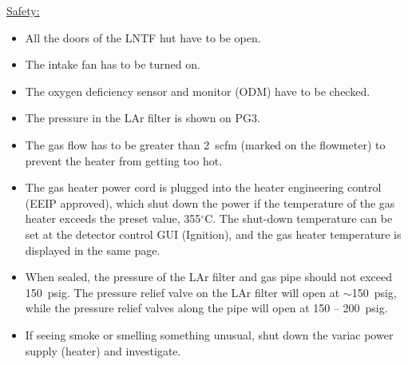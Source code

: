 \documentclass[letterpaper,11pt]{article}
\newcommand{\dC}        {$^\circ$C}
\begin{document}
\underline{Safety:}
\begin{itemize}
\setlength\itemsep{-0.2em}
\item All the doors of the LNTF hut have to be open.
\item The intake fan has to be turned on.
\item The oxygen deficiency sensor and monitor (ODM) have to be checked.
\item The pressure in the LAr filter is shown on PG3.
\item The gas flow has to be greater than 2~scfm (marked on the flowmeter) to prevent the heater 
from getting too hot.
\item The gas heater power cord is plugged into the heater engineering control (EEIP approved), 
which shut down the power if the temperature
of the gas heater exceeds the preset value, 355{\dC}.  
The shut-down temperature can be set at the detector control GUI (Ignition),
and the gas heater temperature is displayed in the same page.
\item When sealed, the pressure of the LAr filter and gas pipe should not exceed 150~psig.
The pressure relief valve on the LAr filter will open at $\sim$150~psig,
while the pressure relief valves along the pipe will open at 150 -- 200~psig.
\item If seeing smoke or smelling something unusual, shut down the variac power supply (heater) 
and investigate.
\end{itemize}
\end{document}
